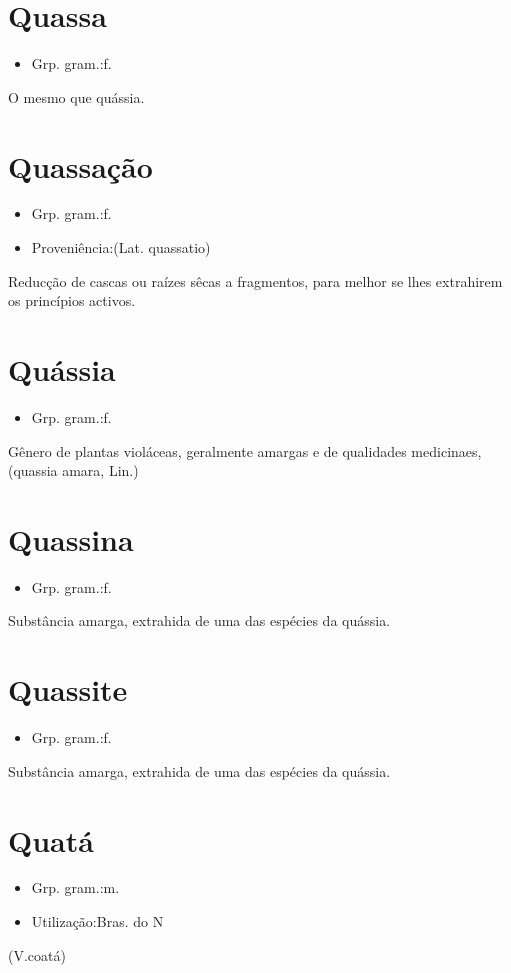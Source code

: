 \section{Quassa}
\begin{itemize}
\item {Grp. gram.:f.}
\end{itemize}
O mesmo que \textunderscore quássia\textunderscore .
\section{Quassação}
\begin{itemize}
\item {Grp. gram.:f.}
\end{itemize}
\begin{itemize}
\item {Proveniência:(Lat. \textunderscore quassatio\textunderscore )}
\end{itemize}
Reducção de cascas ou raízes sêcas a fragmentos, para melhor se lhes extrahirem os princípios activos.
\section{Quássia}
\begin{itemize}
\item {Grp. gram.:f.}
\end{itemize}
Gênero de plantas violáceas, geralmente amargas e de qualidades medicinaes, (\textunderscore quassia amara\textunderscore , Lin.)
\section{Quassina}
\begin{itemize}
\item {Grp. gram.:f.}
\end{itemize}
Substância amarga, extrahida de uma das espécies da quássia.
\section{Quassite}
\begin{itemize}
\item {Grp. gram.:f.}
\end{itemize}
Substância amarga, extrahida de uma das espécies da quássia.
\section{Quatá}
\begin{itemize}
\item {Grp. gram.:m.}
\end{itemize}
\begin{itemize}
\item {Utilização:Bras. do N}
\end{itemize}
(V.coatá)
